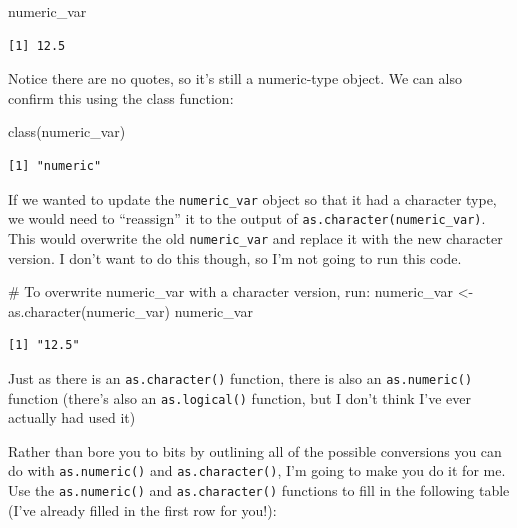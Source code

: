 \documentclass[
  letterpaper,
  DIV=11,
  numbers=noendperiod]{scrreprt}
\newenvironment{Shaded}{\begin{snugshade}}{\end{snugshade}}
\newcommand{\CommentTok}[1]{\textcolor[rgb]{0.37,0.37,0.37}{#1}}
\newcommand{\FunctionTok}[1]{\textcolor[rgb]{0.28,0.35,0.67}{#1}}
\newcommand{\NormalTok}[1]{\textcolor[rgb]{0.00,0.23,0.31}{#1}}
\newcommand{\OtherTok}[1]{\textcolor[rgb]{0.00,0.23,0.31}{#1}}
\begin{document}
\begin{Shaded}
\begin{Highlighting}[]
\NormalTok{numeric\_var}
\end{Highlighting}
\end{Shaded}

\begin{verbatim}
[1] 12.5
\end{verbatim}

Notice there are no quotes, so it's still a numeric-type object. We can
also confirm this using the class function:

\begin{Shaded}
\begin{Highlighting}[]
\FunctionTok{class}\NormalTok{(numeric\_var)}
\end{Highlighting}
\end{Shaded}

\begin{verbatim}
[1] "numeric"
\end{verbatim}

If we wanted to update the \texttt{numeric\_var} object so that it had a
character type, we would need to ``reassign'' it to the output of
\texttt{as.character(numeric\_var)}. This would overwrite the old
\texttt{numeric\_var} and replace it with the new character version. I
don't want to do this though, so I'm not going to run this code.

\begin{Shaded}
\begin{Highlighting}[]
\CommentTok{\# To overwrite numeric\_var with a character version, run:}
\NormalTok{numeric\_var }\OtherTok{\textless{}{-}} \FunctionTok{as.character}\NormalTok{(numeric\_var)}
\NormalTok{numeric\_var}
\end{Highlighting}
\end{Shaded}

\begin{verbatim}
[1] "12.5"
\end{verbatim}

Just as there is an \texttt{as.character()} function, there is also an
\texttt{as.numeric()} function (there's also an \texttt{as.logical()}
function, but I don't think I've ever actually had used it)

Rather than bore you to bits by outlining all of the possible
conversions you can do with \texttt{as.numeric()} and
\texttt{as.character()}, I'm going to make you do it for me. Use the
\texttt{as.numeric()} and \texttt{as.character()} functions to fill in
the following table (I've already filled in the first row for you!):
\end{document}
